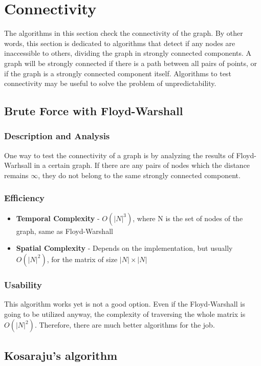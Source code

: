 \newpage
\section{Connectivity}
The algorithms in this section check the connectivity of the graph. By other words, this section is dedicated to algorithms that detect if any nodes are inaccessible to others, dividing the graph in strongly connected components. A graph will be strongly connected if there is a path between all pairs of points, or if the graph is a strongly connected component itself. Algorithms to test connectivity may be useful to solve the problem of unpredictability.


\subsection{Brute Force with Floyd-Warshall}

\subsubsection{Description and Analysis}
One way to test the connectivity of a graph is by analyzing the results of Floyd-Warhsall in a certain graph. If there are any pairs of nodes which the distance remains $\infty$, they do not belong to the same strongly connected component.

\subsubsection{Efficiency}
\begin{itemize}
    \item \textbf{Temporal Complexity} - $ O(|N|^3) $, where N is the set of nodes of the graph, same as Floyd-Warshall
    \item \textbf{Spatial Complexity} - Depends on the implementation, but usually $ O(|N|^2) $, for the matrix of size $|N| \times |N|$
\end{itemize}

\subsubsection{Usability}
This algorithm works yet is not a good option. Even if the Floyd-Warshall is going to be utilized anyway, the complexity of traversing the whole matrix is $O(|N|^2)$. Therefore, there are much better algorithms for the job.


\subsection{Kosaraju's algorithm}

